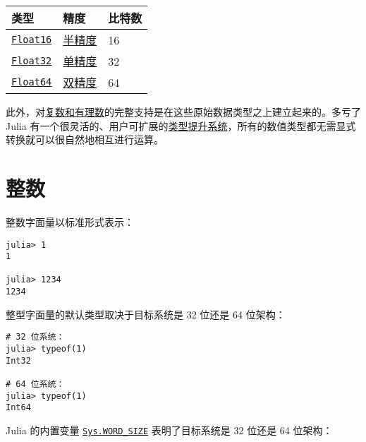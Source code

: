 \begin{table}[h]

\begin{tabulary}{\linewidth}{|L|L|L|}
\hline
类型 & 精度 & 比特数 \\
\hline
\hyperlink{2727296760866702904}{\texttt{Float16}} & \href{https://en.wikipedia.org/wiki/Half-precision\_floating-point\_format}{半精度} & 16 \\
\hline
\hyperlink{8101639384272933082}{\texttt{Float32}} & \href{https://en.wikipedia.org/wiki/Single\_precision\_floating-point\_format}{单精度} & 32 \\
\hline
\hyperlink{5027751419500983000}{\texttt{Float64}} & \href{https://en.wikipedia.org/wiki/Double\_precision\_floating-point\_format}{双精度} & 64 \\
\hline
\end{tabulary}

\end{table}



此外，对\hyperlink{13366825053081777829}{复数和有理数}的完整支持是在这些原始数据类型之上建立起来的。多亏了 Julia 有一个很灵活的、用户可扩展的\hyperlink{10374023657104680331}{类型提升系统}，所有的数值类型都无需显式转换就可以很自然地相互进行运算。



\hypertarget{1329060658000677295}{}


\section{整数}



整数字面量以标准形式表示：




\begin{verbatim}
julia> 1
1

julia> 1234
1234
\end{verbatim}



整型字面量的默认类型取决于目标系统是 32 位还是 64 位架构：




\begin{verbatim}
# 32 位系统：
julia> typeof(1)
Int32

# 64 位系统：
julia> typeof(1)
Int64
\end{verbatim}



Julia 的内置变量 \hyperlink{6553323097149877235}{\texttt{Sys.WORD\_SIZE}} 表明了目标系统是 32 位还是 64 位架构：




